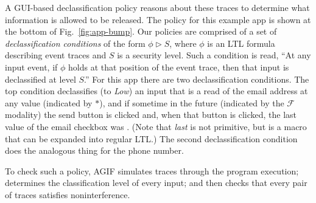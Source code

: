 \documentclass{entcs} \usepackage{entcsmacro}
\newcommand{\code}[1]{\text{\lstinline!#1!}}
\newcommand{\toolname}{AGIF\xspace}
\newcommand{\tfuture}{\mathcal{F}}
\begin{document}
A GUI-based declassification policy reasons about these traces to
determine what information is allowed to be released. The policy for
this example app is shown at the bottom of Fig.~\ref{fig:app-bump}.
Our policies are comprised of a set of \emph{declassification
  conditions} of the form $\phi \rhd S$, where $\phi$ is an LTL
formula describing event traces and $S$ is a security level.  Such a
condition is read, ``At any input event, if $\phi$ holds at that
position of the event trace, then that input is declassified at level
$S$.''  For this app there are two declassification conditions. The
top condition declassifies (to \emph{Low}) an input that is a
read of the email address at any value (indicated by $\ast$), and if
sometime in the future (indicated by the $\tfuture$ modality) the send
button is clicked and, when that button is clicked, the last value of
the email checkbox was \code{true}. (Note that \emph{last} is not
primitive, but is a macro that can be expanded into regular LTL.)  The
second declassification condition does the analogous thing for the
phone number.

To check such a policy, \toolname{} simulates traces through the program
execution; determines the classification level of every input; and
then checks that every pair of traces satisfies noninterference.
\end{document}
